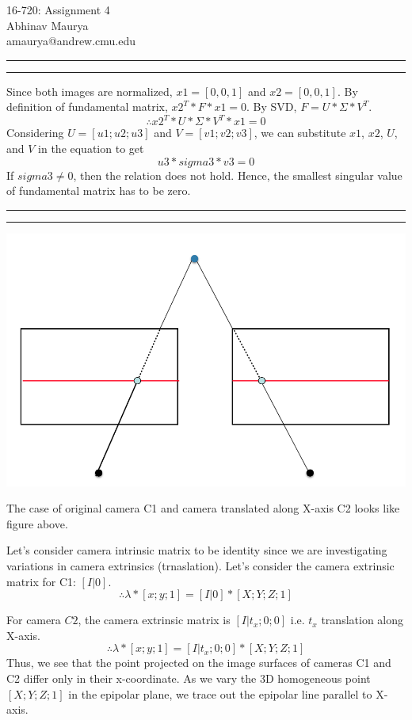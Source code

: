 \documentclass[12pt]{article}\sloppy
\makeatletter
\newcommand{\myname}{Abhinav Maurya}
\newcommand{\myandrew}{amaurya@andrew.cmu.edu}
\newcommand{\myhwnum}{4}
\newcommand{\question}[2] {\vspace{.25in} \hrule\vspace{0.5em} \noindent{\bf #1: #2} \vspace{0.5em} \hrule \vspace{.10in}}
\makeatother
\begin{document}
\medskip                        %

\thispagestyle{plain}
\begin{center}                  %
{\Large 16-720: Assignment \myhwnum} \\
\myname \\
\myandrew \\
\end{center}

\question{1.1}{}

Since both images are normalized, $x1 = [0,0,1]$ and $x2 = [0,0,1]$. By definition of fundamental matrix, $x2^T*F*x1=0$. By SVD, $F = U*\Sigma*V^T$. $$\therefore x2^T*U*\Sigma*V^T*x1=0$$ Considering $U = [u1;u2;u3]$ and $V=[v1;v2;v3]$, we can substitute $x1$, $x2$, $U$, and $V$ in the equation to get $$u3*sigma3*v3=0$$ If $sigma3 \neq 0$, then the relation does not hold. Hence, the smallest singular value of fundamental matrix has to be zero. 

\question{1.2}{}

\includegraphics[width=0.8\linewidth]{fig1.png}

The case of original camera C1 and camera translated along X-axis C2 looks like figure above.

Let's consider camera intrinsic matrix to be identity since we are investigating variations in camera extrinsics (trnaslation). Let's consider the camera extrinsic matrix for C1: $[I | 0]$. $$\therefore \lambda * [x;y;1] = [I | 0] * [X;Y;Z;1]$$

For camera $C2$, the camera extrinsic matrix is $[I | t_x;0;0]$ i.e. $t_x$ translation along X-axis. $$\therefore \lambda * [x;y;1] = [I | t_x;0;0] * [X;Y;Z;1]$$ Thus, we see that the point projected on the image surfaces of cameras C1 and C2 differ only in their x-coordinate. As we vary the 3D homogeneous point $[X;Y;Z;1]$ in the epipolar plane, we trace out the epipolar line parallel to X-axis.
\end{document}
